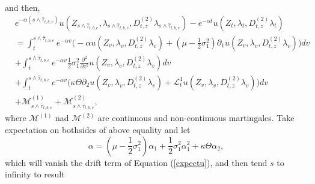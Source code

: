 \documentclass[11pt]{article}
\numberwithin{equation}{section}
\begin{document}
and then, 
\begin{align}
&e^{-\alpha ({s \wedge\hat{\tau}_{t,b,e}})} u(Z_{s\wedge\hat{\tau}_{t,b,e}}, \lambda_{s \wedge\hat{\tau}_{t,b,e}}, D_{t,z}^{(2)}\lambda_{s \wedge\hat{\tau}_{t,b,e}}) -e^{-\alpha t} u(Z_{t}, \lambda_{t}, D_{t,z}^{(2)}\lambda_{t}) \nonumber\\
&  = \int_t^{s \wedge\hat{\tau}_{t,b,e}} e^{-\alpha v}\Big(-\alpha u(Z_v,\lambda_v, D_{t,z}^{(2)}\lambda_{v})+(\mu-\frac12 \sigma_1^2) \partial_1 u(Z_v,\lambda_v, D_{t,z}^{(2)}\lambda_{v})\Big) dv\nonumber\\
& + \int_t^{s \wedge\hat{\tau}_{t,b,e}} e^{-\alpha v} \frac12  \sigma_1^2 \frac{\partial^2}{\partial z^2}  u(Z_v,\lambda_v, D_{t,z}^{(2)}\lambda_{v})dv\nonumber\\
&+  \int_t^{s \wedge\hat{\tau}_{t,b,e}}  e^{-\alpha v}\Big(\kappa\Theta \partial_2 u(Z_v,\lambda_v, D_{t,z}^{(2)}\lambda_{v}) +  \mathcal{L}_t^1 u(Z_v,\lambda_v, D_{t,z}^{(2)}\lambda_{v})\Big) dv \nonumber\\
&+  \mathcal{M}^{(1)}_{s \wedge\hat{\tau}_{t,b,e}}+\mathcal{M}^{(2)}_{s \wedge\hat{\tau}_{t,b,e}},
\label{expectu}
\end{align}
where $\mathcal{M}^{(1)}$ nad $\mathcal{M}^{(2)}$ are continuous and non-continuous martingales. 
Take expectation on bothsides of above equality and let 
$$\alpha= (\mu-\frac12 \sigma_1^2) \alpha_1 +\frac12 \sigma_1^2\alpha_1^2 +\kappa \Theta \alpha_2,$$
 which will vanish the drift term of Equation (\ref{expectu}), and then tend $s$ to infinity to result
\end{document}

